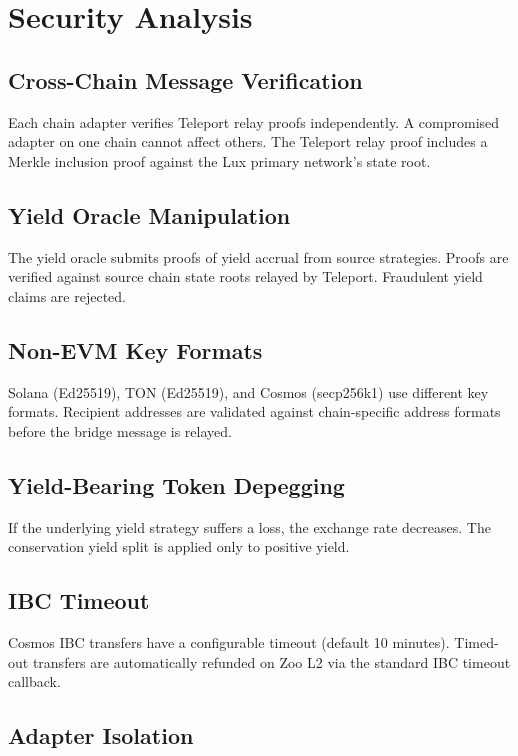 \documentclass[11pt,letterpaper]{article}
\begin{document}
\section{Security Analysis}
\label{sec:security}

\subsection{Cross-Chain Message Verification}

Each chain adapter verifies Teleport relay proofs independently. A compromised adapter on one chain cannot affect others. The Teleport relay proof includes a Merkle inclusion proof against the Lux primary network's state root.

\subsection{Yield Oracle Manipulation}

The yield oracle submits proofs of yield accrual from source strategies. Proofs are verified against source chain state roots relayed by Teleport. Fraudulent yield claims are rejected.

\subsection{Non-EVM Key Formats}

Solana (Ed25519), TON (Ed25519), and Cosmos (secp256k1) use different key formats. Recipient addresses are validated against chain-specific address formats before the bridge message is relayed.

\subsection{Yield-Bearing Token Depegging}

If the underlying yield strategy suffers a loss, the exchange rate decreases. The conservation yield split is applied only to positive yield.

\subsection{IBC Timeout}

Cosmos IBC transfers have a configurable timeout (default 10 minutes). Timed-out transfers are automatically refunded on Zoo L2 via the standard IBC timeout callback.

\subsection{Adapter Isolation}
\end{document}
